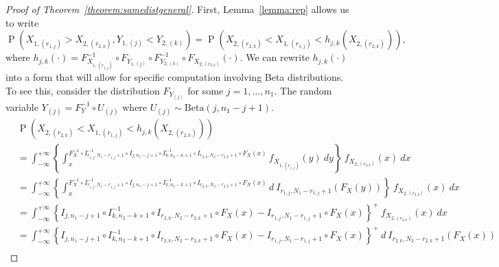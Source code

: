 \documentclass[12pt]{article}
\DeclareMathOperator*{\Prob}{P}
\begin{document}
\begin{proof}[Proof of Theorem~\ref{theorem:samedistgeneral}]
First, Lemma~\ref{lemma:rep} allows us to write
$$
	\Prob\left(X_{1,(r_{1,j})} > X_{2,(r_{2,k})}, Y_{1,(j)} < Y_{2,(k)}\right) = \Prob\left( X_{2,(r_{2,k})} < X_{1,(r_{1,j})}  < h_{j,k}\left(X_{2,(r_{2,k})}\right)\right),
$$
where $h_{j,k}(\cdot) = F_{X_{1,(r_{1,j})}}^{-1} \circ F_{Y_{1, (j)}} \circ F_{Y_{2, (k)}}^{-1} \circ F_{X_{2,(r_{2,k})}} (\cdot)$. We can rewrite $h_{j,k}(\cdot)$ into a form that will allow for specific computation involving Beta distributions. To see this, consider the distribution $F_{Y_{(j)}}$ for some $j = 1,\ldots,n_1$. The random variable $Y_{(j)} = F_Y^{-1} \circ U_{(j)}$ where $U_{(j)} \sim \text{Beta}(j,n_1-j+1)$. 
\begin{align*}
	&\Prob\left( X_{2,(r_{2,k})} < X_{1,(r_{1,j})}  < h_{j,k}\left(X_{2,(r_{2,k})}\right)\right) \\
	&= \int_{-\infty}^{+\infty}\left\{\int_{x}^{F_X^{-1} \circ I_{r_{1,j}, N_1-r_{1,j}+1}^{-1} \circ I_{j, n_1-j+1} \circ I_{k, n_2-k+1}^{-1} \circ I_{r_{2,k}, N_2-r_{2,k}+1} \circ F_X(x)} f_{X_{1,(r_{1,j})}}(y)\ dy\right\} \ f_{X_{2,(r_{2,k})}}(x) \ dx \\
	&= \int_{-\infty}^{+\infty}\left\{\int_{x}^{F_X^{-1} \circ I_{r_{1,j}, N_1-r_{1,j}+1}^{-1} \circ I_{j, n_1-j+1} \circ I_{k, n_2-k+1}^{-1} \circ I_{r_{2,k}, N_2-r_{2,k}+1} \circ F_X(x)} d \ I_{ r_{1,j}, N_1- r_{1,j}+1}(F_X(y))\right\} \ f_{X_{2,(r_{2,k})}}(x) \ dx \\
	&= \int_{-\infty}^{+\infty}\left\{I_{j, n_1-j+1} \circ I_{k, n_2-k+1}^{-1} \circ I_{ r_{2,k}, N_2- r_{2,k}+1} \circ F_X(x) - I_{ r_{1,j}, N_1- r_{1,j}+1} \circ F_X(x)\right\}^+ \ f_{X_{2,(r_{2,k})}}(x) \ dx \\
	&= \int_{-\infty}^{+\infty}\left\{I_{j, n_1-j+1} \circ I_{k, n_2-k+1}^{-1} \circ I_{ r_{2,k}, N_2- r_{2,k}+1} \circ F_X(x) - I_{ r_{1,j}, N_1- r_{1,j}+1} \circ F_X(x)\right\}^+ \  d \ I_{ r_{2,k}, N_2- r_{2,k}+1}(F_X(x)) \\

\end{align*}
\end{proof}
\end{document}
